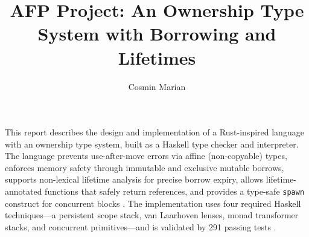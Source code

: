 \documentclass[a4paper]{article}
\title{\textbf{AFP Project:} An Ownership Type System with Borrowing and Lifetimes}
\author{Cosmin Marian}
\begin{document}
\maketitle

This report describes the design and implementation of a Rust-inspired language
with an ownership type system, built as a Haskell type checker and interpreter.
The language prevents use-after-move errors via affine (non-copyable) types,
enforces memory safety through immutable and exclusive mutable borrows, supports
non-lexical lifetime analysis for precise borrow expiry, allows lifetime-annotated
functions that safely return references, and provides a type-safe \texttt{spawn}
construct for concurrent blocks \cite{klabnik_understanding_2021}.
The implementation uses four required Haskell techniques---a persistent scope
stack, van Laarhoven lenses, monad transformer stacks, and concurrent
primitives---and is validated by 291 passing tests
\cite{weirich_implementing_2023}.





\printbibliography[heading=bibintoc, title={References}]
\end{document}
